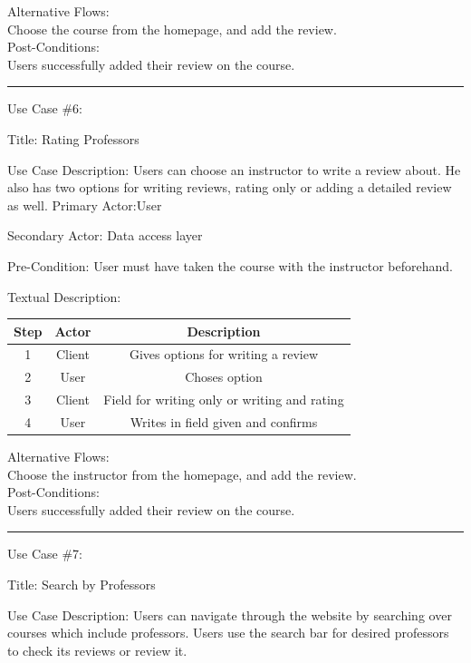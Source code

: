 \documentclass{article}
\begin{document}
	Alternative Flows:\\
	Choose the course from the homepage, and add the review.\\
	Post-Conditions:\\
	Users successfully added their review on the course.\\

  \hrule

Use Case \#6: 

	Title: Rating Professors

Use Case Description: Users can choose an instructor to write a review about. He also has two options for writing reviews, rating only or adding a detailed review as well. 
	Primary Actor:User

	Secondary Actor: Data access layer

	Pre-Condition: User must have taken the course with the instructor beforehand.

	Textual Description: 
	
\begin{center}
  \begin{tabular}{|c|c|c|}
    \hline
    Step & 
    Actor & 
Description \\ \hline
    1 &
    Client &
Gives options for writing a review \\
    2 &
    User & 
Choses option \\
    3&
    Client&
Field for writing only or writing and rating\\ 
    4 &
    User &
Writes in field given and confirms \\ \hline
\end{tabular} 
\end{center}

Alternative Flows:\\
	Choose the instructor from the homepage, and add the review.\\
	Post-Conditions:\\
	Users successfully added their review on the course.\\ 

\hrule 



Use Case \#7: 

	Title: Search by Professors

	Use Case Description:
Users can navigate through the website by searching over courses which include professors.  Users use the search bar for desired professors to check its reviews or review it.
\end{document}
